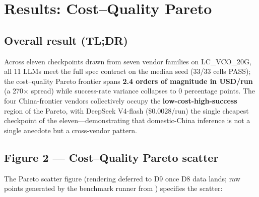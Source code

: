 
\section{Results: Cost--Quality Pareto}
\label{sec:results}

\subsection{Overall result (TL;DR)}
\label{sec:results-tldr}

Across eleven checkpoints drawn from seven vendor families on
LC\_VCO\_20G, all 11 LLMs meet the full spec contract on the
median seed (33/33 cells PASS); the cost--quality Pareto frontier
spans \textbf{2.4 orders of magnitude in USD/run} (a 270$\times$
spread) while success-rate variance collapses to 0 percentage
points. The four China-frontier vendors collectively occupy the
\textbf{low-cost-high-success} region of the Pareto, with DeepSeek
V4-flash (\$0.0028/run) the single cheapest checkpoint of the
eleven---demonstrating that domestic-China inference is not a
single anecdote but a cross-vendor pattern.

\subsection{Figure 2 --- Cost--Quality Pareto scatter}
\label{sec:results-pareto-fig}

The Pareto scatter figure (rendering deferred to D9 once D8 data
lands; raw points generated by the benchmark runner from
) specifies the scatter:

